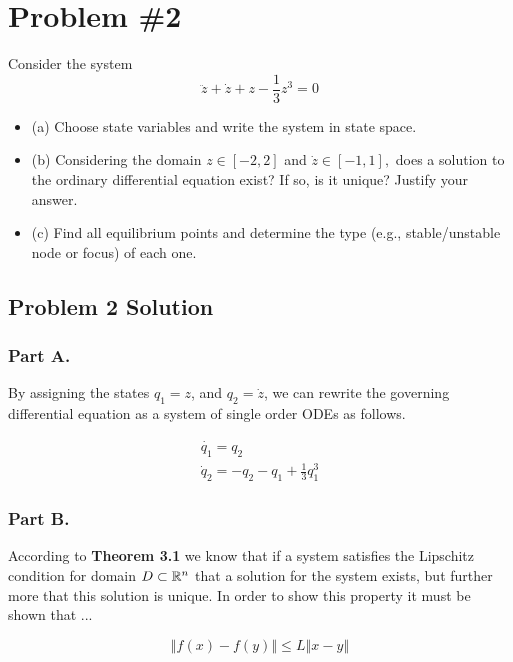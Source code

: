 \section*{Problem \#2}

Consider the system
$$
\ddot{z}+\dot{z}+z-\frac{1}{3} z^{3}=0
$$

\begin{itemize}
  \item (a) Choose state variables and write the system in state space.
  \item (b) Considering the domain $z \in[-2,2]$ and $\dot{z} \in[-1,1],$ does a solution to the ordinary differential equation exist? If so, is it unique? Justify your answer.
  \item (c) Find all equilibrium points and determine the type (e.g., stable/unstable node or focus) of each one.
\end{itemize}





\subsection*{\textbf{Problem 2 Solution}}

\subsubsection*{\textbf{Part A.}}

By assigning the states $q_1 = z$, and $q_2 = \dot{z}$, we can rewrite the governing differential equation as a system of single order ODEs as follows.

$$
\begin{array}{l}
\dot{q_{1}}=q_{2} \\
\dot{q}_{2}=-q_{2}-q_{1}+\frac{1}{3} q_{1}^{3}
\end{array}
$$



\subsubsection*{\textbf{Part B.}}

According to \textbf{Theorem 3.1} we know that if a system satisfies the Lipschitz condition for domain $D \subset \mathbb{R}^n$ that a solution for the system exists, but further more that this solution is unique. In order to show this property it must be shown that ...

$$
\left\Vert f(x) - f(y) \right\Vert \leq L \left\Vert x - y\right\Vert
$$


